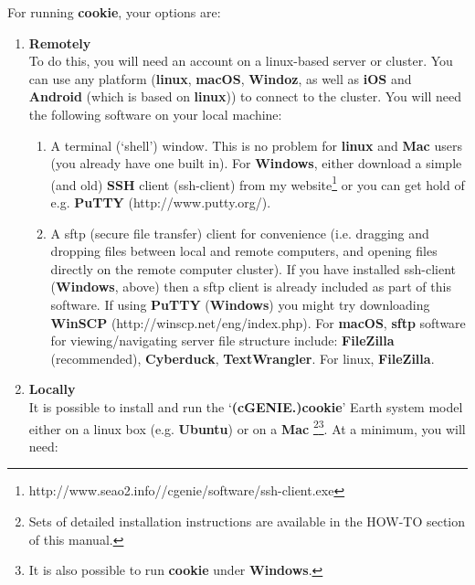 For running \textbf{cookie}, your options are:

\begin{enumerate}[noitemsep]

\vspace{1mm}
\item \textbf{Remotely}
\\To do this, you will need an account on a linux-based server or cluster. You can use any platform (\textbf{linux}, \textbf{macOS}, \textbf{Windoz}, as well as \textbf{iOS} and \textbf{Android} (which is based on \textbf{linux})) to connect to the cluster. You will need the following software on your local machine:
\vspace{1mm}
\begin{enumerate}[noitemsep]
\setlength{\itemindent}{.2in}
\item A terminal (‘shell’) window. This is no problem for \textbf{linux} and \textbf{Mac} users (you already have one built in). For \textbf{Windows}, either download a simple (and old) \textbf{SSH} client (ssh-client) from my website\footnote{http://www.seao2.info//cgenie/software/ssh-client.exe} or you can get hold of e.g. \textbf{PuTTY} (http://www.putty.org/).
\item A sftp (secure file transfer) client for convenience (i.e. dragging and dropping files between local and remote computers, and opening files directly on the remote computer cluster). If you have installed ssh-client (\textbf{Windows}, above) then a sftp client is already included as part of this software. If using \textbf{PuTTY} (\textbf{Windows}) you might try downloading \textbf{WinSCP} (http://winscp.net/eng/index.php). For \textbf{macOS}, \textbf{sftp} software for viewing/navigating server file structure include: \textbf{FileZilla} (recommended), \textbf{Cyberduck}, \textbf{TextWrangler}. For linux, \textbf{FileZilla}.
\end{enumerate}

\vspace{1mm}
\item \textbf{Locally}
\\It is  possible to install and run the ‘\textbf{(cGENIE.)cookie}’ Earth system model either on a linux box (e.g. \textbf{Ubuntu}) or on a \textbf{Mac} \footnote{Sets of detailed installation instructions are available in the HOW-TO section of this manual.}\footnote{It is also possible to run \textbf{cookie} under \textbf{Windows}.}. At a minimum, you will need:


\end{enumerate}
